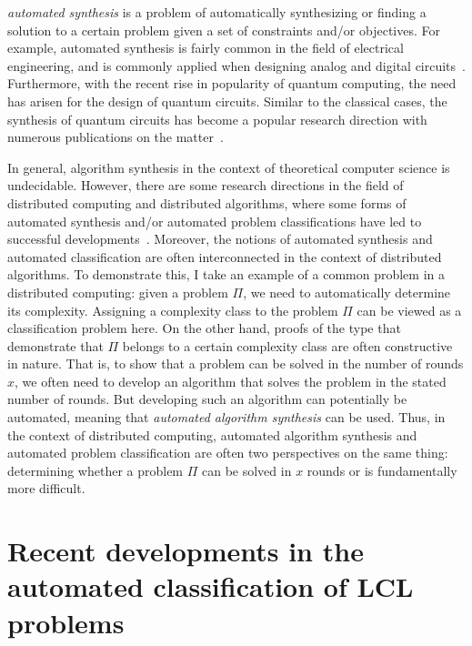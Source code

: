 \emph{automated synthesis} is a problem of automatically
synthesizing or finding
a solution to a certain problem given a set of constraints and/or
objectives. For example, automated synthesis is fairly common
in the field of electrical engineering, and is commonly
applied when designing analog and digital circuits~\cite{synthesis_,
synthesis_autoAx}. Furthermore, with the recent rise in popularity
of quantum computing, the need has arisen for the design of quantum
circuits. Similar to the classical cases, the synthesis of
quantum circuits has become a popular research direction
with numerous publications on the matter~\cite{synthesis_Khan2017,
synthesis_Meuli2018, synthesis_Miller2003}.

In general, algorithm synthesis in the context of theoretical
computer science is undecidable. However, there are some
research directions in the field of distributed computing and
distributed algorithms, where some forms of automated synthesis and/or
automated problem classifications have led to successful
developments~\cite{Balliu2018, da-synthesis_Rybicki2015,
da-synthesis_Klinkhamer2016,
da-synthesis_Hirvonen2017, da-synthesis_Fathiyeh2015, da-synthesis_Dolev2016,
Chang2017, Brandt2017, da-synthesis_Bloem2016}. Moreover,
the notions of automated synthesis and automated classification are
often interconnected in the context of distributed algorithms.
To demonstrate this, I take an example of a common problem in
a distributed computing: given a problem $\Pi$, we need to
automatically determine its complexity. Assigning a complexity
class to the problem $\Pi$ can be viewed as a classification
problem here. On the other hand, proofs of the type that
demonstrate that $\Pi$ belongs to a certain complexity class
are often constructive in nature. That is, to show that a
problem can be solved in the number of rounds $x$, we
often need to develop an algorithm that solves the problem
in the stated number of rounds. But developing such an algorithm
can potentially be automated, meaning that \emph{automated
algorithm synthesis} can be used. Thus, in the context of
distributed computing, automated algorithm
synthesis and automated problem classification are often two perspectives
on the same thing: determining whether a problem $\Pi$ can be solved
in $x$ rounds or is fundamentally more difficult.

\section{Recent developments in the automated classification of LCL problems}

